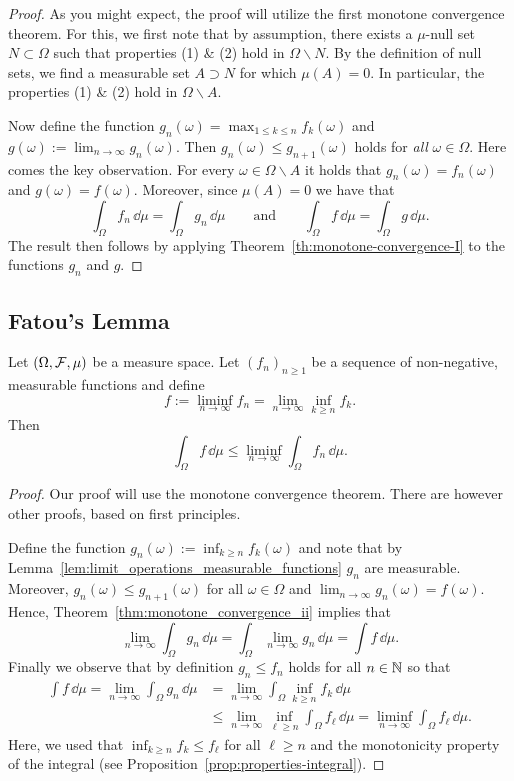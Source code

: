 \begin{proof}
As you might expect, the proof will utilize the first monotone convergence theorem. For this, we first note that by assumption, there exists a $\mu$-null set $N\subset \Omega$ such that properties (1) \& (2) hold in $\Omega\backslash N$. By the definition of null sets, we find a measurable set $A \supset N$ for which $\mu(A)=0$. In particular, the properties (1) \& (2) hold in $\Omega\backslash A$.

Now define the function $g_n(\omega) = \max_{1 \le k \le n} f_k(\omega)$ and $g(\omega) := \lim_{n \to \infty} g_n(\omega)$. Then $g_n(\omega) \le g_{n+1}(\omega)$ holds for \emph{all} $\omega \in \Omega$. Here comes the key observation. For every $\omega \in \Omega\backslash A$ it holds that $g_n(\omega) = f_n(\omega)$ and $g(\omega) = f(\omega)$. Moreover, since $\mu(A) = 0$ we have that
\[
	\int_\Omega f_n \, \dd \mu = \int_\Omega g_n \, \dd \mu \qquad \text{and} \qquad
	\int_\Omega f \, \dd \mu = \int_\Omega g \, \dd \mu.
\]
The result then follows by applying Theorem~\ref{th:monotone-convergence-I} to the functions $g_n$ and $g$.
\end{proof}

\subsection{Fatou's Lemma}

\begin{theorem}\label{thm:fatou}
Let $(\Omega, \mathcal F, \mu)$ be a measure space. Let $(f_n)_{n \ge 1}$ be a sequence of non-negative, measurable functions and define
\[
	f := \liminf_{n\to \infty} f_n = \lim_{n \to \infty} \inf_{k \ge n} f_k.
\]
Then
\[
	\int_\Omega f\, \dd \mu \le \liminf_{n\to \infty} \int_\Omega f_n \,\dd \mu.
\]
\end{theorem}

\begin{proof}
Our proof will use the monotone convergence theorem. There are however other proofs, based on first principles. 

Define the function $g_n(\omega) := \inf_{k \ge n} f_k(\omega)$ and note that by Lemma~\ref{lem:limit_operations_measurable_functions} $g_n$ are measurable. Moreover, $g_n(\omega) \le g_{n+1}(\omega)$ for all $\omega \in \Omega$ and $\lim_{n \to \infty} g_n(\omega) = f(\omega)$. Hence, Theorem~\ref{thm:monotone_convergence_ii} implies that
\[
	\lim_{n \to \infty} \int_\Omega g_n \, \dd \mu = \int_\Omega \lim_{n \to \infty} g_n \, \dd \mu
	= \int f \, \dd \mu. 
\]
Finally we observe that by definition $g_n \le f_n$ holds for all $n \in \mathbb N$ so that
\begin{align*}
	\int f \, \dd \mu = \lim_{n \to \infty} \int_\Omega g_n \, \dd \mu
	&= \lim_{n \to \infty} \int_\Omega \inf_{k \ge n} f_k \, \dd \mu \\
	&\le \lim_{n \to \infty} \inf_{\ell \ge n} \int_\Omega  f_\ell \, \dd \mu
	= \liminf_{n \to \infty} \int_\Omega  f_\ell \, \dd \mu.
\end{align*}
Here, we used that $\inf_{k \ge n} f_k \le f_\ell$ for all $\ell \ge n$ and the monotonicity property of the integral (see Proposition~\ref{prop:properties-integral}).
\end{proof}

